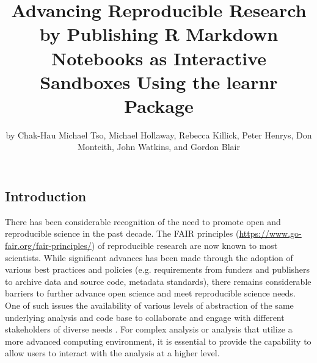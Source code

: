 \title{Advancing Reproducible Research by Publishing R Markdown Notebooks as
Interactive Sandboxes Using the learnr Package}
\author{by Chak-Hau Michael Tso, Michael Hollaway, Rebecca Killick, Peter Henrys, Don Monteith, John Watkins, and Gordon Blair}

\maketitle


\hypertarget{introduction}{%
\subsection{Introduction}\label{introduction}}

There has been considerable recognition of the need to promote open and
reproducible science in the past decade. The FAIR principles
\citep{Wilkinson2016a, Stall2019}
(\url{https://www.go-fair.org/fair-principles/}) of reproducible research
are now known to most scientists. While significant advances has been
made through the adoption of various best practices and policies
(e.g. requirements from funders and publishers to archive data and
source code, metadata standards), there remains considerable barriers to
further advance open science and meet reproducible science needs. One of
such issues the availability of various levels of abstraction of the
same underlying analysis and code base to collaborate and engage with
different stakeholders of diverse needs \citep{Blair2019, Hollaway2020}.
For complex analysis or analysis that utilize a more advanced computing
environment, it is essential to provide the capability to allow users to
interact with the analysis at a higher level.

